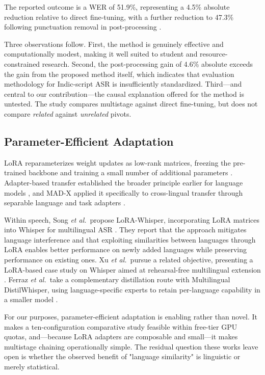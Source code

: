 \documentclass[conference]{IEEEtran}
\begin{document}
The reported outcome is a WER of 51.9\%, representing a 4.5\% absolute
reduction relative to direct fine-tuning, with a further reduction to
47.3\% following punctuation removal in post-processing
\cite{pillai2024multistage}.

Three observations follow. First, the method is genuinely effective and
computationally modest, making it well suited to student and
resource-constrained research. Second, the post-processing gain of 4.6\%
absolute exceeds the gain from the proposed method itself, which
indicates that evaluation methodology for Indic-script ASR is
insufficiently standardized. Third---and central to our contribution---the
causal explanation offered for the method is untested. The study
compares multistage against direct fine-tuning, but does not compare
\emph{related} against \emph{unrelated} pivots.

\subsection{Parameter-Efficient Adaptation}

LoRA reparameterizes weight updates as low-rank matrices, freezing the
pre-trained backbone and training a small number of additional
parameters \cite{hu2022lora}. Adapter-based transfer established the
broader principle earlier for language models
\cite{houlsby2019adapters}, and MAD-X applied it specifically to
cross-lingual transfer through separable language and task adapters
\cite{pfeiffer2020madx}.

Within speech, Song \emph{et al.}\ propose LoRA-Whisper, incorporating
LoRA matrices into Whisper for multilingual ASR
\cite{song2024lorawhisper}. They report that the approach mitigates
language interference and that exploiting similarities between languages
through LoRA enables better performance on newly added languages while
preserving performance on existing ones. Xu \emph{et al.}\ pursue a
related objective, presenting a LoRA-based case study on Whisper aimed
at rehearsal-free multilingual extension \cite{xu2024rehearsalfree}.
Ferraz \emph{et al.}\ take a complementary distillation route with
Multilingual DistilWhisper, using language-specific experts to retain
per-language capability in a smaller model
\cite{ferraz2024distilwhisper}.

For our purposes, parameter-efficient adaptation is enabling rather than
novel. It makes a ten-configuration comparative study feasible within
free-tier GPU quotas, and---because LoRA adapters are composable and
small---it makes multistage chaining operationally simple. The residual
question these works leave open is whether the observed benefit of
"language similarity" is linguistic or merely statistical.
\end{document}
